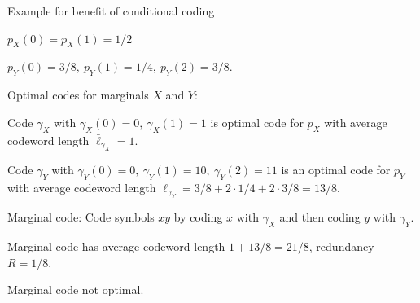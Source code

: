 \begin{frame}{Example for benefit of conditional coding}
\bit 
\item $p_X(0)=p_X(1)=1/2$
\item $p_Y(0)=3/8, \:p_Y(1)=1/4, \:p_Y(2)=3/8.$
\eit
{}
\bit
\item Optimal codes for marginals $X$ and $Y$:
\bit
\item Code $\gamma_X$ with $\gamma_X(0)=0,\:\gamma_X(1)=1$ is optimal code for $p_X$ with average 
codeword length $\bar{\ell}_{\gamma_X} = 1$.
\item Code $\gamma_Y$ with $\gamma_Y(0)=0,\: \gamma_Y(1)=10,\: \gamma_Y(2)= 11$ is an optimal code for $p_Y$ with average 
codeword length $\bar{\ell}_{\gamma_Y}=3/8+2\cdot 1/4+2\cdot 3/8=13/8$. 
\eit
\item Marginal code: Code symbols $xy$ by coding $x$ with $\gamma_X$ and then coding $y$ with $\gamma_Y$. 
\item Marginal code has average codeword-length $1+13/8=21/8$, redundancy $R=1/8$.
\item Marginal code not optimal.
\eit


\end{frame}

